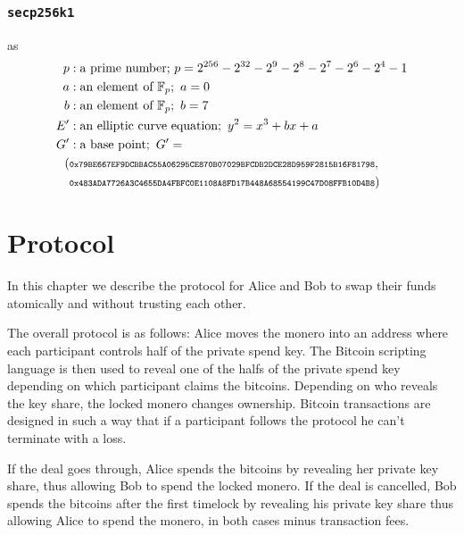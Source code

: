 \documentclass{llncs}
\begin{document}
\subsubsection{\texttt{secp256k1}} as
\begin{equation}
\begin{split}
    p&: \text{a prime number;}\ p = 2^{256} - 2^{32} - 2^9 - 2^8 - 2^7 - 2^6 - 2^4 - 1 \\
    a&: \text{an element of } \mathbb{F}_p;\ a = 0 \\
    b&: \text{an element of } \mathbb{F}_p;\ b = 7 \\
    E'&: \text{an elliptic curve equation};\ y^2 = x^3 + bx + a \\
    G'&: \text{a base point};\ G' = \\ (&\scriptsize\texttt{0x79BE667EF9DCBBAC55A06295CE870B07029BFCDB2DCE28D959F2815B16F81798},\\ &\scriptsize\texttt{0x483ADA7726A3C4655DA4FBFC0E1108A8FD17B448A68554199C47D08FFB10D4B8}) \\
\end{split}
\end{equation}

\section{Protocol}
In this chapter we describe the protocol for Alice and Bob to swap their funds atomically and without trusting each other.

The overall protocol is as follows: Alice moves the monero into an address where each participant controls half of the private spend key. The Bitcoin scripting language is then used to reveal one of the halfs of the private spend key depending on which participant claims the bitcoins. Depending on who reveals the key share, the locked monero changes ownership. Bitcoin transactions are designed in such a way that if a participant follows the protocol he can't terminate with a loss.

If the deal goes through, Alice spends the bitcoins by revealing her private key share, thus allowing Bob to spend the locked monero. If the deal is cancelled, Bob spends the bitcoins after the first timelock by revealing his private key share thus allowing Alice to spend the monero, in both cases minus transaction fees.
\end{document}
